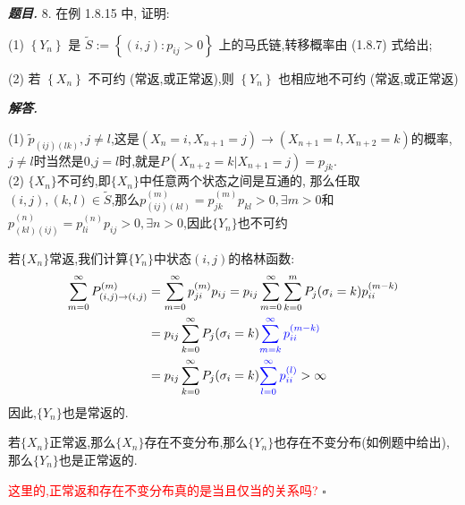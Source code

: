 \documentclass[10pt, a4paper, oneside]{ctexart}
\newenvironment{problem}{\begin{framed}\par\noindent\textbf{\textit{题目. }}}{\end{framed}\par}
\newenvironment{solution}{%
  \par\noindent\textbf{\textit{解答. }}\ignorespaces
}{%
  \hfill\ensuremath{\square}\par %
}
\begin{document}
\begin{problem}
    8. 在例 1.8.15 中, 证明:

(1) \( \left\{  {Y}_{n}\right\}   \) 是 \( \widetilde{S} \mathrel{\text{:=}} \left\{  {\left( {i,j}\right)  : {p}_{ij} > 0}\right\}   \) 上的马氏链,转移概率由 (1.8.7) 式给出;

(2) 若 \( \left\{  {X}_{n}\right\}   \) 不可约 (常返,或正常返),则 \( \left\{  {Y}_{n}\right\}   \) 也相应地不可约 (常返,或正常返)
\end{problem}
\begin{solution}
    (1) $\tilde{p}_{(ij)(lk)},j\neq l$,这是$(X_n=i,X_{n+1}=j)\to(X_{n+1}=l,X_{n+2}=k)$的概率,$j\neq l$时当然是$0$,$j=l$时,就是$P(X_{n+2}=k|X_{n+1}=j)=p_{jk}$.\\
    (2) $\{X_n\}$不可约,即$\{X_n\}$中任意两个状态之间是互通的, 那么任取$(i,j),(k,l)\in \tilde{S}$,那么$p_{(ij)(kl)}^{(m)}=p_{jk}^{(m)}p_{kl}>0,\exists m>0$和$p_{(kl)(ij)}^{(n)}=p_{li}^{(n)}p_{ij}>0,\exists n>0$,因此$\{Y_n\}$也不可约

    若$\{X_n\}$常返,我们计算$\{Y_n\}$中状态$(i,j)$的格林函数:
    \begin{align*}
        \sum_{m=0}^{\infty}P_{(i,j)\to (i,j)}^{(m)}&=\sum_{m=0}^{\infty}p_{ji}^{(m)}p_{ij}=p_{ij}\sum_{m=0}^{\infty}\sum_{k=0}^{m}P_{j}(\sigma_i=k)p_{ii}^{(m-k)}\\
        &=p_{ij}\sum_{k=0}^{\infty}P_{j}(\sigma_i=k)\textcolor{blue}{\sum_{m=k}^{\infty}p_{ii}^{(m-k)}}\\
        &=p_{ij}\sum_{k=0}^{\infty}P_{j}(\sigma_i=k)\textcolor{blue}{\sum_{l=0}^{\infty}p_{ii}^{(l)}}>\infty
    \end{align*}
    因此,$\{Y_n\}$也是常返的.

    若$\{X_n\}$正常返,那么$\{X_n\}$存在不变分布,那么$\{Y_n\}$也存在不变分布(如例题中给出),那么$\{Y_n\}$也是正常返的.
    
    \textcolor{red}{这里的,正常返和存在不变分布真的是当且仅当的关系吗?}
\end{solution}
\end{document}

